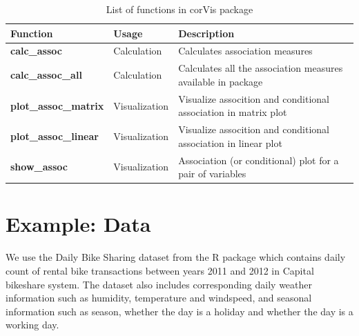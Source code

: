 \begin{Schunk}
\begin{table}

\caption{\label{tab:function-corVis}List of functions in corVis package}
\centering
\begin{tabular}[t]{>{}lll}
\toprule
Function & Usage & Description\\
\midrule
\textbf{calc\_assoc} & Calculation & Calculates association measures\\
\textbf{calc\_assoc\_all} & Calculation & Calculates all the association measures available in package\\
\textbf{plot\_assoc\_matrix} & Visualization & Visualize assocition and conditional association in matrix plot\\
\textbf{plot\_assoc\_linear} & Visualization & Visualize assocition and conditional association in linear plot\\
\textbf{show\_assoc} & Visualization & Association (or conditional) plot for a pair of variables\\
\bottomrule
\end{tabular}
\end{table}

\end{Schunk}

\hypertarget{example-data}{%
\section{Example: Data}\label{example-data}}

We use the Daily Bike Sharing dataset \citep{bikeref} from the R package
 \citep{timetk} which contains daily count of rental
bike transactions between years 2011 and 2012 in Capital bikeshare
system. The dataset also includes corresponding daily weather
information such as humidity, temperature and windspeed, and seasonal
information such as season, whether the day is a holiday and whether the
day is a working day.

